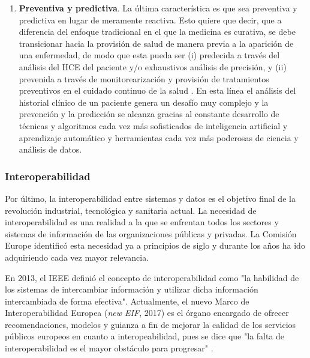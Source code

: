 \begin{enumerate}

\item \textbf{Preventiva y predictiva}. La última característica es que sea preventiva y predictiva en lugar de meramente reactiva. Esto quiere que decir, que a diferencia del enfoque tradicional en el que la medicina es curativa, se debe transicionar hacia la provisión de salud de manera previa a la aparición de una enfermedad, de modo que esta pueda ser (i) predecida a través del análisis del HCE del paciente y/o exhaustivos análisis de precisión, y (ii) prevenida a través de monitorearización y provisión de tratamientos preventivos en el cuidado continuo de la salud \cite{ruiz2023inteligencia}. En esta línea el análisis del historial clínico de un paciente genera un desafío muy complejo y la prevención y la predicción se alcanza gracias al constante desarrollo de técnicas y algoritmos cada vez más sofisticados de inteligencia artificial y aprendizaje automático y herramientas cada vez más poderosas de ciencia y análisis de datos.
\end{enumerate}

\subsubsection{Interoperabilidad}

Por último, la interoperabilidad entre sistemas y datos es el objetivo final de la revolución industrial, tecnológica y sanitaria actual. La necesidad de interoperabilidad es una realidad a la que se enfrentan todos los sectores y sistemas de información de las organizaciones públicas y privadas. La Comisión Europe identificó esta necesidad ya a principios de siglo \cite{CEU1999ida} y durante los años ha ido adquiriendo cada vez mayor relevancia. 

En 2013, el IEEE definió el concepto de interoperabilidad como "la habilidad de los sistemas de intercambiar información y utilizar dicha información intercambiada de forma efectiva". Actualmente, el nuevo Marco de Interoperabilidad Europea (\textit{new EIF}, 2017) es el órgano encargado de ofrecer recomendaciones, modelos y guianza a fin de mejorar la calidad de los servicios públicos europeos en cuanto a interopeabilidad, pues se dice que "la falta de interoperabilidad es el mayor obstáculo para progresar" \cite{kouroubali2019new}.

